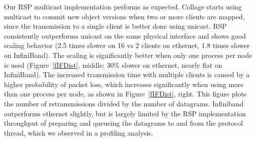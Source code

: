 \documentclass[10pt,journal,compsoc]{IEEEtran}
\newcommand{\fig}[1]{Figure~\ref{#1}}
\begin{document}
Our RSP multicast implementation performs as expected. \textsf{Collage} starts
using multicast to commit new object versions when two or more clients are
mapped, since the transmission to a single client is better done using unicast.
RSP consistently outperforms unicast on the same physical interface and shows
good scaling behavior (2.5 times slower on 16 vs 2 clients on ethernet, 1.8
times slower on InfiniBand). The scaling is significantly better when only one
process per node is used (\fig{fIFDist}, middle: 30\% slower on ethernet,
nearly flat on InfiniBand). The increased transmission time with multiple
clients is caused by a higher probability of packet loss, which increases
significantly when using more than one process per node, as shown in
\fig{fIFDist}, right. This figure plots the number of retransmissions
divided by the number of datagrams. Infiniband outperforms ethernet slightly,
but is largely limited by the RSP implementation throughput of preparing and
queueing the datagrams to and from the protocol thread, which we observed in a
profiling analysis.
\end{document}
